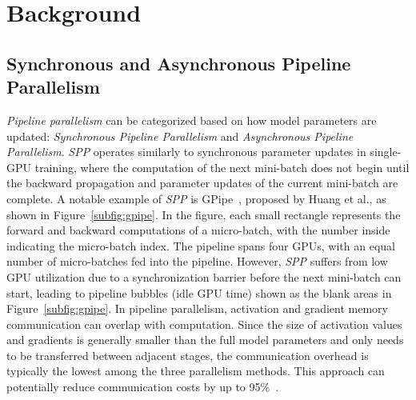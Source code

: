 \section{Background}
\label{sec:background}
\subsection{Synchronous and Asynchronous Pipeline Parallelism}
\emph{Pipeline parallelism} can be categorized based on how model parameters are updated:
\emph{Synchronous Pipeline Parallelism} and \emph{Asynchronous Pipeline Parallelism}.
\emph{SPP} operates similarly to synchronous parameter updates in single-GPU training,
where the computation of the next mini-batch does not begin until
the backward propagation and parameter updates of the current mini-batch are complete.
A notable example of \emph{SPP} is GPipe~\cite{huangGpipeEfficientTraining2019}, proposed by Huang et al., as shown in Figure~\ref{subfig:gpipe}.
In the figure, each small rectangle represents the forward and backward computations of a micro-batch,
with the number inside indicating the micro-batch index.
The pipeline spans four GPUs, with an equal number of micro-batches fed into the pipeline.
However, \emph{SPP} suffers from low GPU utilization due to a synchronization barrier before the next mini-batch can start,
leading to pipeline bubbles (idle GPU time) shown as the blank areas in Figure~\ref{subfig:gpipe}.
In pipeline parallelism,
activation and gradient memory communication can overlap with computation.
Since the size of activation values and gradients is generally smaller than the full model parameters
and only needs to be transferred between adjacent stages,
the communication overhead is typically the lowest among the three parallelism methods.
This approach can potentially reduce communication costs by up to 95\%~\cite{narayananPipeDreamGeneralizedPipeline2019}.

